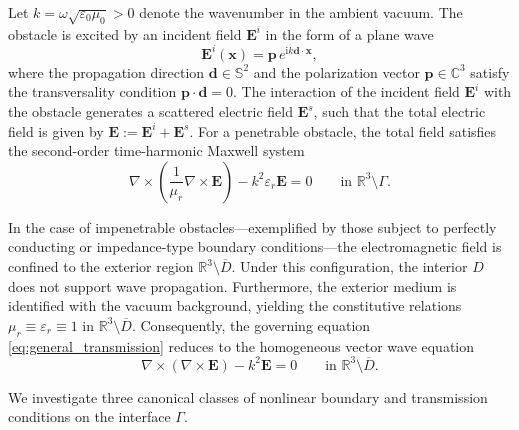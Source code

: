 \documentclass[12pt,reqno]{amsart}
\theoremstyle{definition}
\numberwithin{equation}{section}
\begin{document}
Let $k = \omega\sqrt{\varepsilon_0\mu_0} > 0$ denote the wavenumber in the ambient vacuum. The obstacle is excited by an incident field $\mathbf{E}^i$ in the form of a plane wave
\[
\mathbf{E}^i(\boldsymbol{x}) = \boldsymbol{p} \, e^{\mathrm{i}k\boldsymbol{d}\cdot\boldsymbol{x}},
\]
where the propagation direction $\boldsymbol{d} \in \mathbb{S}^2$ and the polarization vector $\boldsymbol{p} \in \mathbb{C}^3$ satisfy the transversality condition $\boldsymbol{p} \cdot \boldsymbol{d} = 0$.
The interaction of the incident field $\mathbf{E}^i$ with the obstacle generates a scattered electric field $\mathbf{E}^s$, such that the total electric field is given by $\mathbf{E} := \mathbf{E}^i + \mathbf{E}^s$. For a penetrable obstacle, the total field satisfies the second-order time-harmonic Maxwell system
\begin{equation}\label{eq:general_transmission}
\nabla \times
\left(
\frac{1}{\mu_r}\nabla \times \mathbf{E}
\right)
-
k^2\varepsilon_r\mathbf{E}
=
0
\qquad
\text{in } \mathbb{R}^3 \setminus \Gamma.
\end{equation}

In the case of impenetrable obstacles---exemplified by those subject to perfectly conducting or impedance-type boundary conditions---the electromagnetic field is confined to the exterior region $\mathbb{R}^3 \setminus \overline{D}$. Under this configuration, the interior $D$ does not support wave propagation. Furthermore, the exterior medium is identified with the vacuum background, yielding the constitutive relations $\mu_r \equiv \varepsilon_r \equiv 1$ in $\mathbb{R}^3 \setminus \overline{D}$. Consequently, the governing equation \eqref{eq:general_transmission} reduces to the homogeneous vector wave equation
\begin{equation}\label{eq:exterior_equation}
\nabla \times (\nabla \times \mathbf{E}) - k^2 \mathbf{E} = 0 \qquad \text{in } \mathbb{R}^3 \setminus \overline{D}.
\end{equation}

We investigate three canonical classes of nonlinear boundary and transmission conditions on the interface $\Gamma$.
\end{document}
